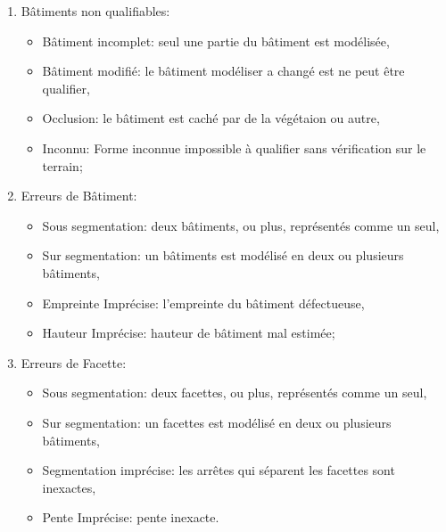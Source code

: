 \documentclass[a4paper,french]{article}
\begin{document}
    \begin{enumerate}[label= (\roman*)., itemsep=0pt]
        \item Bâtiments non qualifiables:
        \begin{itemize}[itemsep=0pt]
            \item Bâtiment incomplet: seul une partie du bâtiment est modélisée,
            \item Bâtiment modifié: le bâtiment modéliser a changé est ne peut être qualifier,
            \item Occlusion: le bâtiment est caché par de la végétaion ou autre,
            \item Inconnu: Forme inconnue impossible à qualifier sans vérification sur le terrain;
        \end{itemize}
        \item Erreurs de Bâtiment:
        \begin{itemize}[itemsep=0pt]
            \item Sous segmentation: deux bâtiments, ou plus, représentés comme un seul,
            \item Sur segmentation: un bâtiments est modélisé en deux ou plusieurs bâtiments,
            \item Empreinte Imprécise: l'empreinte du bâtiment défectueuse,
            \item Hauteur Imprécise: hauteur de bâtiment mal estimée;
        \end{itemize}
        \item Erreurs de Facette:
        \begin{itemize}[itemsep=0pt]
            \item Sous segmentation: deux facettes, ou plus, représentés comme un seul,
            \item Sur segmentation: un facettes est modélisé en deux ou plusieurs bâtiments,
            \item Segmentation imprécise: les arrêtes qui séparent les facettes sont inexactes,
            \item Pente Imprécise: pente inexacte.
        \end{itemize}
    \end{enumerate}
\end{document}
